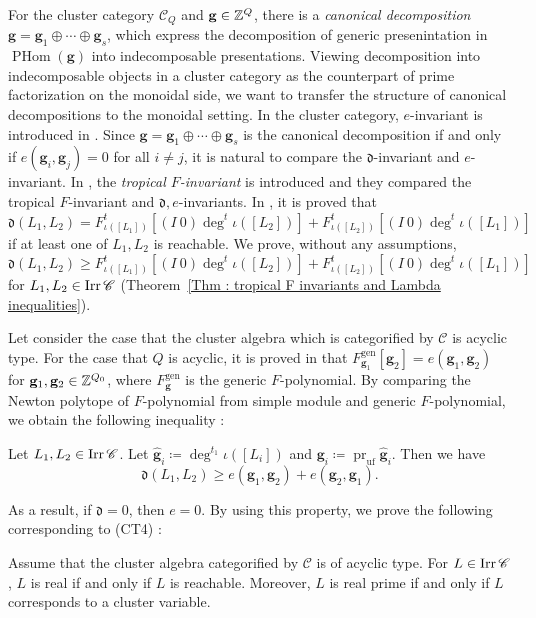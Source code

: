 For the cluster category $\mathcal{C}_{Q}$ and $\mathbf{g} \in \mathbb{Z}^Q$, 
there is a \emph{canonical decomposition} $\mathbf{g} = \mathbf{g}_1 \oplus \cdots\oplus \mathbf{g}_s$, 
which express the decomposition of generic presenintation in $\operatorname{PHom}(\mathbf{g})$ 
into indecomposable presentations. 
Viewing decomposition into indecomposable objects in a cluster category 
as the counterpart of prime factorization on the monoidal side, 
we want to transfer the structure of canonical decompositions to the monoidal setting. 
In the cluster category, $e$-invariant is introduced in \cite{DF15}. 
Since $\mathbf{g}=\mathbf{g}_1\oplus\cdots\oplus\mathbf{g}_s$ is the canonical decomposition 
if and only if $e(\mathbf{g}_i,\mathbf{g}_j)=0$ for all $i\neq j$, 
it is natural to compare the $\mathfrak d$-invariant and $e$-invariant. 
In \cite{Cao, Fei23}, 
the \emph{tropical $F$-invariant} is introduced and they compared the tropical $F$-invariant and 
$\mathfrak{d}, e$-invariants. 
In \cite{Cao}, it is proved that 
$\mathfrak{d}(L_1, L_2) = F_{\iota([L_1])}^t[(I\ 0)\deg^t\iota([L_2])]
+ F_{\iota([L_2])}^t[(I\ 0)\deg^t\iota([L_1])]$ if at least one of $L_1, L_2$ is reachable. 
We prove, without any assumptions, 
$\mathfrak{d}(L_1, L_2) \geq F_{\iota([L_1])}^t[(I\ 0)\deg^t\iota([L_2])]
+ F_{\iota([L_2])}^t[(I\ 0)\deg^t\iota([L_1])]$
 for $L_1, L_2 \in \mathop{\mathrm{Irr}}\nolimits{\mathscr{C}}$
 (Theorem~\ref{Thm : tropical F invariants and Lambda inequalities}). 

Let consider the case that the cluster algebra which is categorified by $\mathscr{C}$ is acyclic type. 
For the case that  $Q$ is acyclic, 
it is proved in \cite{Fei23} that 
$F_{\mathbf{g}_1}^{\mathrm{gen}}[\mathbf{g}_2] = e(\mathbf{g}_1, \mathbf{g}_2)$ 
for $\mathbf{g}_1, \mathbf{g}_2\in \mathbb{Z}^{Q_0}$, 
where $F_{\mathbf{g}}^{\mathrm{gen}}$ is the generic $F$-polynomial. 
By comparing the Newton polytope of $F$-polynomial from simple module and generic $F$-polynomial, 
we obtain the following inequality : 
\begin{Thm}
  Let $L_1, L_2 \in \mathop{\mathrm{Irr}}\nolimits\mathscr{C}$.
Let $\widehat{\mathbf{g}}_i
\coloneq \deg^{t_1}\iota([L_i])$ and
$\mathbf{g}_i
\coloneq \operatorname{pr}_{\mathrm{uf}}\widehat{\mathbf{g}}_i$.
Then we have
\[
\mathfrak{d}(L_1, L_2)
\geq e(\mathbf{g}_1, \mathbf{g}_2)
+ e(\mathbf{g}_2, \mathbf{g}_1).
\]
\end{Thm}

As a result, if $\mathfrak{d} = 0$, then $e = 0$. 
By using this property, we prove the following corresponding to (CT4) : 
\begin{Thm}
Assume that the cluster algebra categorified by $\mathscr{C}$ is of acyclic type. 
For $L \in \mathop{\mathrm{Irr}}\nolimits\mathscr{C}$,
$L$ is real if and only if $L$ is reachable.
Moreover, $L$ is real prime if and only if
$L$ corresponds to a cluster variable.
\end{Thm}




